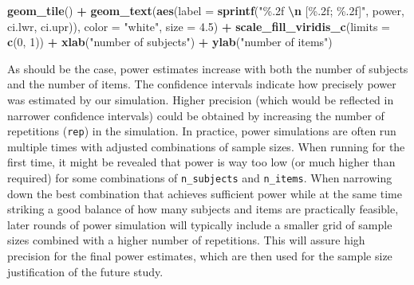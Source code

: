 \documentclass[
  man,floatsintext]{apa6}
\newenvironment{Shaded}{\begin{snugshade}}{\end{snugshade}}
\newcommand{\AttributeTok}[1]{\textcolor[rgb]{0.13,0.29,0.53}{#1}}
\newcommand{\DecValTok}[1]{\textcolor[rgb]{0.00,0.00,0.81}{#1}}
\newcommand{\FloatTok}[1]{\textcolor[rgb]{0.00,0.00,0.81}{#1}}
\newcommand{\FunctionTok}[1]{\textcolor[rgb]{0.13,0.29,0.53}{\textbf{#1}}}
\newcommand{\NormalTok}[1]{#1}
\newcommand{\SpecialCharTok}[1]{\textcolor[rgb]{0.81,0.36,0.00}{\textbf{#1}}}
\newcommand{\StringTok}[1]{\textcolor[rgb]{0.31,0.60,0.02}{#1}}
\begin{document}
\begin{Shaded}
\begin{Highlighting}[]
  \FunctionTok{geom\_tile}\NormalTok{() }\SpecialCharTok{+}
  \FunctionTok{geom\_text}\NormalTok{(}\FunctionTok{aes}\NormalTok{(}\AttributeTok{label =} \FunctionTok{sprintf}\NormalTok{(}\StringTok{"\%.2f }\SpecialCharTok{\textbackslash{}n}\StringTok{ [\%.2f; \%.2f]"}\NormalTok{, }
\NormalTok{                                power, ci.lwr, ci.upr)), }
    \AttributeTok{color =} \StringTok{"white"}\NormalTok{, }\AttributeTok{size =} \FloatTok{4.5}\NormalTok{) }\SpecialCharTok{+}
  \FunctionTok{scale\_fill\_viridis\_c}\NormalTok{(}\AttributeTok{limits =} \FunctionTok{c}\NormalTok{(}\DecValTok{0}\NormalTok{, }\DecValTok{1}\NormalTok{)) }\SpecialCharTok{+}
  \FunctionTok{xlab}\NormalTok{(}\StringTok{"number of subjects"}\NormalTok{) }\SpecialCharTok{+} \FunctionTok{ylab}\NormalTok{(}\StringTok{"number of items"}\NormalTok{)}
\end{Highlighting}
\end{Shaded}

As should be the case, power estimates increase with both the number of subjects and the number of items. The confidence intervals indicate how precisely power was estimated by our simulation. Higher precision (which would be reflected in narrower confidence intervals) could be obtained by increasing the number of repetitions (\texttt{rep}) in the simulation. In practice, power simulations are often run multiple times with adjusted combinations of sample sizes. When running for the first time, it might be revealed that power is way too low (or much higher than required) for some combinations of \texttt{n\_subjects} and \texttt{n\_items}. When narrowing down the best combination that achieves sufficient power while at the same time striking a good balance of how many subjects and items are practically feasible, later rounds of power simulation will typically include a smaller grid of sample sizes combined with a higher number of repetitions. This will assure high precision for the final power estimates, which are then used for the sample size justification of the future study.
\end{document}
